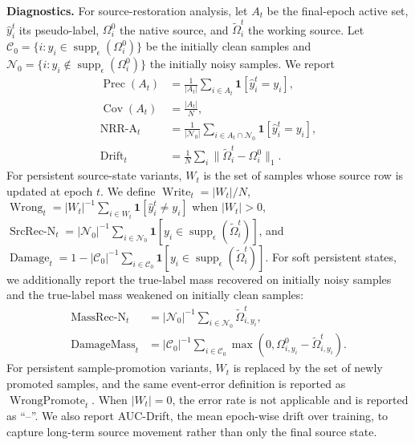\textbf{Diagnostics.}
For source-restoration analysis, let $A_t$ be the final-epoch active set,
$\hat{y}_i^t$ its pseudo-label, $\Omega_i^0$ the native source, and
$\tilde{\Omega}_i^t$ the working source. Let
$\mathcal{C}_0=\{i:y_i\in\operatorname{supp}_\epsilon(\Omega_i^0)\}$ be the
initially clean samples and
$\mathcal{N}_0=\{i:y_i\notin\operatorname{supp}_\epsilon(\Omega_i^0)\}$ the
initially noisy samples. We report
\begin{align}
\operatorname{Prec}(A_t)&=\frac{1}{|A_t|}\sum_{i\in A_t}\mathbf{1}[\hat{y}_i^t=y_i],
\nonumber\\
\operatorname{Cov}(A_t)&=\frac{|A_t|}{N}, \nonumber\\
\operatorname{NRR\mbox{-}A}_t
&=\frac{1}{|\mathcal{N}_0|}
\sum_{i\in A_t\cap\mathcal{N}_0}\mathbf{1}[\hat{y}_i^t=y_i],
\nonumber\\
\operatorname{Drift}_t
&=\frac{1}{N}\sum_i\|\tilde{\Omega}_i^t-\Omega_i^0\|_1 .
\label{eq:diagnostics_active}
\end{align}
For persistent source-state variants, $W_t$ is the set of samples whose source
row is updated at epoch $t$. We define
$\operatorname{Write}_t=|W_t|/N$,
$\operatorname{Wrong}_t=|W_t|^{-1}\sum_{i\in W_t}\mathbf{1}[\hat{y}_i^t\ne y_i]$
when $|W_t|>0$,
$\operatorname{SrcRec\mbox{-}N}_t=
|\mathcal{N}_0|^{-1}\sum_{i\in\mathcal{N}_0}\mathbf{1}[y_i\in\operatorname{supp}_\epsilon(\tilde{\Omega}_i^t)]$,
and
$\operatorname{Damage}_t=
1-|\mathcal{C}_0|^{-1}\sum_{i\in\mathcal{C}_0}\mathbf{1}[y_i\in\operatorname{supp}_\epsilon(\tilde{\Omega}_i^t)]$.
For soft persistent states, we additionally report the true-label mass recovered
on initially noisy samples and the true-label mass weakened on initially clean
samples:
\begin{align}
\operatorname{MassRec\mbox{-}N}_t
&=
|\mathcal{N}_0|^{-1}
\sum_{i\in\mathcal{N}_0}\tilde{\Omega}_{i,y_i}^t,
\nonumber\\
\operatorname{DamageMass}_t
&=
|\mathcal{C}_0|^{-1}
\sum_{i\in\mathcal{C}_0}
\max(0,\Omega_{i,y_i}^0-\tilde{\Omega}_{i,y_i}^t).
\nonumber
\end{align}
For persistent sample-promotion variants, $W_t$ is replaced by the set of newly
promoted samples, and the same event-error definition is reported as
$\operatorname{WrongPromote}_t$. When $|W_t|=0$, the error rate is not
applicable and is reported as ``--''. We also report AUC-Drift, the mean
epoch-wise drift over training, to capture long-term source movement rather than
only the final source state.

